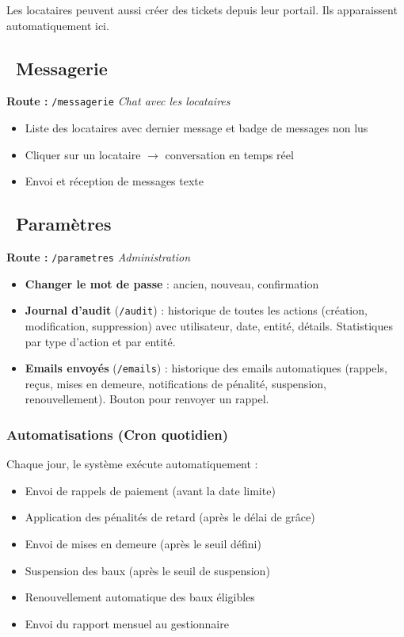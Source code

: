 \documentclass[12pt,a4paper]{article}
\begin{document}
\begin{tipbox}
Les locataires peuvent aussi cr\'eer des tickets depuis leur portail. Ils apparaissent automatiquement ici.
\end{tipbox}

\subsection{\faComments\ Messagerie}
\textbf{Route :} \texttt{/messagerie} \hfill \textit{Chat avec les locataires}

\begin{itemize}
\item Liste des locataires avec dernier message et badge de messages non lus
\item Cliquer sur un locataire $\rightarrow$ conversation en temps r\'eel
\item Envoi et r\'eception de messages texte
\end{itemize}

\subsection{\faCog\ Param\`etres}
\textbf{Route :} \texttt{/parametres} \hfill \textit{Administration}

\begin{itemize}
\item \textbf{Changer le mot de passe} : ancien, nouveau, confirmation
\item \textbf{Journal d'audit} (\texttt{/audit}) : historique de toutes les actions (cr\'eation, modification, suppression) avec utilisateur, date, entit\'e, d\'etails. Statistiques par type d'action et par entit\'e.
\item \textbf{Emails envoy\'es} (\texttt{/emails}) : historique des emails automatiques (rappels, re\c{c}us, mises en demeure, notifications de p\'enalit\'e, suspension, renouvellement). Bouton pour renvoyer un rappel.
\end{itemize}

\subsubsection{Automatisations (Cron quotidien)}
Chaque jour, le syst\`eme ex\'ecute automatiquement :
\begin{itemize}
\item Envoi de rappels de paiement (avant la date limite)
\item Application des p\'enalit\'es de retard (apr\`es le d\'elai de gr\^ace)
\item Envoi de mises en demeure (apr\`es le seuil d\'efini)
\item Suspension des baux (apr\`es le seuil de suspension)
\item Renouvellement automatique des baux \'eligibles
\item Envoi du rapport mensuel au gestionnaire
\end{itemize}
\end{document}
